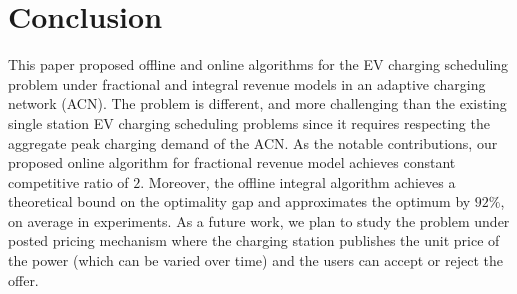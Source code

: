 \section{Conclusion}
			\label{sec:conclusion}
This paper proposed offline and online algorithms for the EV charging scheduling problem under fractional and integral revenue models in an adaptive charging network (ACN). The problem is different, and more challenging than the existing single station EV charging scheduling problems since it requires respecting the aggregate peak charging demand of the ACN. 
As the notable contributions, our proposed online algorithm for fractional revenue model achieves constant competitive ratio of $2$. Moreover, the offline integral algorithm achieves a theoretical bound on the optimality gap and approximates the optimum by $92\%$, on average in experiments. As a future work, we plan to study the problem under posted pricing mechanism where the charging station publishes the unit price of the power (which can be varied over time) and the users can accept or reject the offer.

%
%
%		
%		
%
%
%
